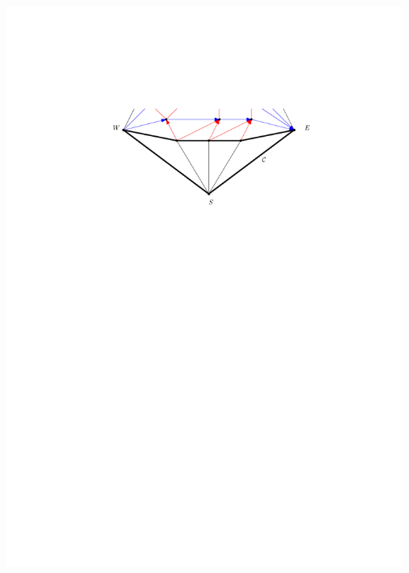 \documentclass[a4paper]{article}
\begin{document}
\includegraphics[width = \textwidth]{./unifiedAlgo/img/sweep/terminateBefore.pdf}
\clearpage%
\end{document}
